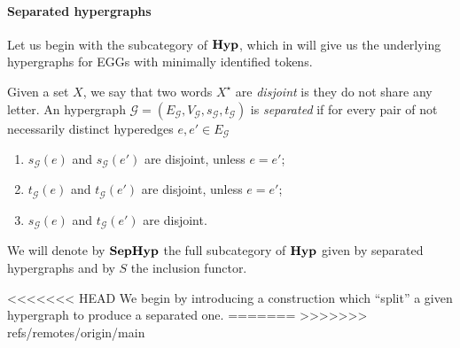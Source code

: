 \documentclass[3p]{elsarticle}
\newcommand{\catname}[1]{\textbf{\textup{#1}}}
\newcommand{\hyp}{\catname{Hyp}}
\newcommand{\shyp}{\catname{SepHyp}}
\theoremstyle{remark}
\theoremstyle{definition}
\begin{document}
\paragraph{Separated hypergraphs}

Let us begin with the subcategory of $\hyp$, which in  will give us the underlying hypergraphs for EGGs with minimally identified tokens.

\begin{defi} Given a set $X$, we say that two words $X^\star$ are \emph{disjoint} is they do not share any letter. An hypergraph $\mathcal{G}=(E_{\mathcal{G}}, V_{\mathcal{G}}, s_{\mathcal{G}}, t_{\mathcal{G}})$ is \emph{separated} if for every pair of not necessarily distinct hyperedges $e, e'\in E_{\mathcal{G}}$
	\begin{enumerate}
	\item $s_{\mathcal{G}}(e)$ and $s_{\mathcal{G}}(e')$ are disjoint, unless $e = e'$;
	\item $t_{\mathcal{G}}(e)$ and $t_{\mathcal{G}}(e')$ are disjoint, unless $e = e'$;	
	\item $s_{\mathcal{G}}(e)$ and $t_{\mathcal{G}}(e')$ are disjoint.
	\end{enumerate}
We will denote by $\shyp$ the full subcategory of $\hyp$ given by separated hypergraphs and by $S$ the inclusion functor.
\end{defi}

<<<<<<< HEAD
We begin by introducing a construction which ``split'' a given hypergraph to produce a separated one.
=======
>>>>>>> refs/remotes/origin/main
\end{document}
